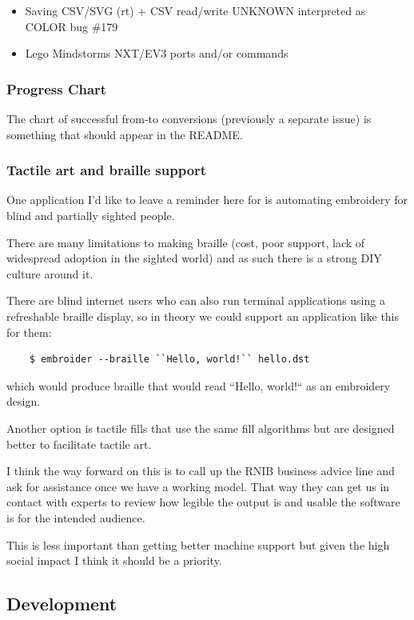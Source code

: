 \documentclass[a4paper, 11pt]{report}
\begin{document}
\begin{itemize}
\item Saving CSV/SVG (rt) + CSV read/write UNKNOWN interpreted as COLOR bug \#179
\item Lego Mindstorms NXT/EV3 ports and/or commands
\end{itemize}

\subsubsection{Progress Chart}

The chart of successful from-to conversions (previously a separate issue)
is something that should appear in the README.

\subsubsection{Tactile art and braille support}

One application I'd like to leave a reminder here for is automating embroidery
for blind and partially sighted people.

There are many limitations to making braille (cost, poor support, lack of
widespread adoption in the sighted world) and as such there is a strong DIY
culture around it.

There are blind internet users who can also run terminal applications using a
refreshable braille display, so in theory we could support an application like
this for them:

\begin{verbatim}
    $ embroider --braille ``Hello, world!`` hello.dst
\end{verbatim}

which would produce braille that would read ``Hello, world!`` as an embroidery design.

Another option is tactile fills that use the same fill algorithms but are
designed better to facilitate tactile art.

I think the way forward on this is to call up the RNIB business advice line and ask for assistance once we have a working model. That way they can get us in contact with experts to review how legible the output is and usable the software is for the intended audience.

This is less important than getting better machine support but given the high social impact I think it should be a priority.

\subsection{Development}
\end{document}
